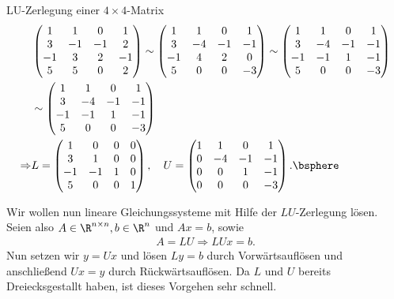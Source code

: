 \begin{bspn} LU-Zerlegung einer $4\times 4$-Matrix
\begin{align*}
&\begin{pmatrix}
1 & 1 & 0 & 1\\
3 & -1 & -1 & 2\\
-1 & 3 & 2 & -1\\
5 & 5 & 0 & 2
\end{pmatrix}
\sim
\begin{pmatrix}
1 & 1 & 0 & 1\\
3 & -4 & -1 & -1\\
-1 & 4 & 2 & 0\\
5 & 0 & 0 & -3
\end{pmatrix}
\sim
\begin{pmatrix}
1 & 1 & 0 & 1\\
3 & -4 & -1 & -1\\
-1 & -1 & 1 & -1\\
5 & 0 & 0 & -3
\end{pmatrix}\\
&\sim
\begin{pmatrix}
1 & 1 & 0 & 1\\
3 & -4 & -1 & -1\\
-1 & -1 & 1 & -1\\
5 & 0 & 0 & -3
\end{pmatrix}\\
\Rightarrow &
L =
\begin{pmatrix}
1 & 0 & 0 & 0\\
3 & 1 & 0 & 0\\
-1 & -1 & 1 & 0\\
5 & 0 & 0 & 1
\end{pmatrix},\quad
U = 
\begin{pmatrix}
1 & 1 & 0 & 1\\
0 & -4 & -1 & -1\\
0 & 0 & 1 & -1\\
0 & 0 & 0 & -3
\end{pmatrix}.\bsphere
\end{align*}
\end{bspn}

Wir wollen nun lineare Gleichungssysteme mit Hilfe der $LU$-Zerlegung lösen.
Seien also $A\in\R^{n\times n}, b\in\R^n$ und $Ax = b$, sowie
\begin{align*}
A=LU \Rightarrow LUx = b.
\end{align*}
Nun setzen wir $y=Ux$ und lösen $Ly=b$ durch Vorwärtsauflösen und anschließend
$Ux = y$ durch Rückwärtsauflösen. Da $L$ und $U$ bereits
Dreiecksgestallt haben, ist dieses Vorgehen sehr schnell.

